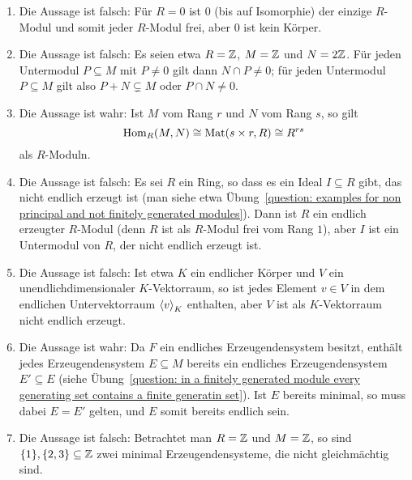 \begin{solution}
\begin{enumerate}
    \item
      Die Aussage ist falsch:
      Für $R = 0$ ist $0$ (bis auf Isomorphie) der einzige $R$-Modul und somit jeder $R$-Modul frei, aber $0$ ist kein Körper.
      
    \item
      Die Aussage ist falsch:
      Es seien etwa $R = \mathbb{Z}$, $M = \mathbb{Z}$ und $N = 2\mathbb{Z}$.
      Für jeden Untermodul $P \subseteq M$ mit $P \neq 0$ gilt dann $N \cap P \neq 0$;
      für jeden Untermodul $P \subseteq M$ gilt also $P + N \subsetneq M$ oder $P \cap N \neq 0$.
      
    \item
      Die Aussage ist wahr:
      Ist $M$ vom Rang $r$ und $N$ vom Rang $s$, so gilt
      \[
              \operatorname{Hom}_R(M,N)
        \cong \operatorname{Mat}(s \times r, R)
        \cong R^{rs}
      \]
      als $R$-Moduln.
      
    \item
      Die Aussage ist falsch:
      Es sei $R$ ein Ring, so dass es ein Ideal $I \subseteq R$ gibt, das nicht endlich erzeugt ist (man siehe etwa Übung~\ref{question: examples for non principal and not finitely generated modules}).
      Dann ist $R$ ein endlich erzeugter $R$-Modul (denn $R$ ist als $R$-Modul frei vom Rang $1$), aber $I$ ist ein Untermodul von $R$, der nicht endlich erzeugt ist.
      
    \item
      Die Aussage ist falsch:
      Ist etwa $K$ ein endlicher Körper und $V$ ein unendlichdimensionaler $K$-Vektorraum, so ist jedes Element $v \in V$ in dem endlichen Untervektorraum $\left\langle v \right\rangle_K$ enthalten, aber $V$ ist als $K$-Vektorraum nicht endlich erzeugt.
      
    \item
      Die Aussage ist wahr:
      Da $F$ ein endliches Erzeugendensystem besitzt, enthält jedes Erzeugendensystem $E \subseteq M$ bereits ein endliches Erzeugendensystem $E' \subseteq E$ (siehe Übung~\ref{question: in a finitely generated module every generating set contains a finite generatin set}).
      Ist $E$ bereits minimal, so muss dabei $E = E'$ gelten, und $E$ somit bereits endlich sein.
      
    \item
      Die Aussage ist falsch:
      Betrachtet man $R = \mathbb{Z}$ und $M = \mathbb{Z}$, so sind $\{1\}, \{2, 3\} \subseteq \mathbb{Z}$ zwei minimal Erzeugendensysteme, die nicht gleichmächtig sind.
      

\end{enumerate}
\end{solution}
